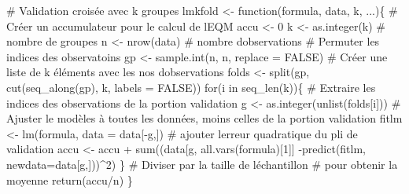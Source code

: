 \documentclass[
  11pt,
  letterpaper,
]{book}
\newenvironment{Shaded}{\begin{snugshade}}{\end{snugshade}}
\newcommand{\AttributeTok}[1]{\textcolor[rgb]{0.40,0.45,0.13}{#1}}
\newcommand{\CommentTok}[1]{\textcolor[rgb]{0.37,0.37,0.37}{#1}}
\newcommand{\ConstantTok}[1]{\textcolor[rgb]{0.56,0.35,0.01}{#1}}
\newcommand{\ControlFlowTok}[1]{\textcolor[rgb]{0.00,0.23,0.31}{#1}}
\newcommand{\DecValTok}[1]{\textcolor[rgb]{0.68,0.00,0.00}{#1}}
\newcommand{\FunctionTok}[1]{\textcolor[rgb]{0.28,0.35,0.67}{#1}}
\newcommand{\NormalTok}[1]{\textcolor[rgb]{0.00,0.23,0.31}{#1}}
\newcommand{\OtherTok}[1]{\textcolor[rgb]{0.00,0.23,0.31}{#1}}
\newcommand{\SpecialCharTok}[1]{\textcolor[rgb]{0.37,0.37,0.37}{#1}}
\theoremstyle{definition}
\theoremstyle{remark}
\begin{document}
\begin{Shaded}
\begin{Highlighting}[]
\CommentTok{\# Validation croisée avec k groupes}
\NormalTok{lmkfold }\OtherTok{\textless{}{-}} \ControlFlowTok{function}\NormalTok{(formula, data, k, ...)\{}
   \CommentTok{\# Créer un accumulateur pour le calcul de l\textquotesingle{}EQM}
\NormalTok{   accu }\OtherTok{\textless{}{-}} \DecValTok{0}
\NormalTok{   k }\OtherTok{\textless{}{-}} \FunctionTok{as.integer}\NormalTok{(k) }\CommentTok{\# nombre de groupes}
\NormalTok{   n }\OtherTok{\textless{}{-}} \FunctionTok{nrow}\NormalTok{(data) }\CommentTok{\# nombre d\textquotesingle{}observations}
   \CommentTok{\# Permuter les indices des observatoins}
\NormalTok{   gp }\OtherTok{\textless{}{-}} \FunctionTok{sample.int}\NormalTok{(n, n, }\AttributeTok{replace =} \ConstantTok{FALSE}\NormalTok{)}
   \CommentTok{\# Créer une liste de k éléments avec les nos d\textquotesingle{}observations}
\NormalTok{   folds }\OtherTok{\textless{}{-}} \FunctionTok{split}\NormalTok{(gp, }\FunctionTok{cut}\NormalTok{(}\FunctionTok{seq\_along}\NormalTok{(gp), k, }\AttributeTok{labels =} \ConstantTok{FALSE}\NormalTok{))}
   \ControlFlowTok{for}\NormalTok{(i }\ControlFlowTok{in} \FunctionTok{seq\_len}\NormalTok{(k))\{}
      \CommentTok{\# Extraire les indices des observations de la portion validation}
\NormalTok{      g }\OtherTok{\textless{}{-}} \FunctionTok{as.integer}\NormalTok{(}\FunctionTok{unlist}\NormalTok{(folds[i]))}
      \CommentTok{\# Ajuster le modèles à toutes les données, moins celles de la portion validation}
\NormalTok{      fitlm }\OtherTok{\textless{}{-}} \FunctionTok{lm}\NormalTok{(formula, }\AttributeTok{data =}\NormalTok{ data[}\SpecialCharTok{{-}}\NormalTok{g,])}
      \CommentTok{\# ajouter l\textquotesingle{}erreur quadratique du pli de validation}
\NormalTok{      accu }\OtherTok{\textless{}{-}}\NormalTok{ accu }\SpecialCharTok{+} \FunctionTok{sum}\NormalTok{((data[g, }\FunctionTok{all.vars}\NormalTok{(formula)[}\DecValTok{1}\NormalTok{]] }\SpecialCharTok{{-}}\FunctionTok{predict}\NormalTok{(fitlm, }\AttributeTok{newdata=}\NormalTok{data[g,]))}\SpecialCharTok{\^{}}\DecValTok{2}\NormalTok{)}
\NormalTok{   \}}
   \CommentTok{\# Diviser par la taille de l\textquotesingle{}échantillon }
   \CommentTok{\# pour obtenir la moyenne}
   \FunctionTok{return}\NormalTok{(accu}\SpecialCharTok{/}\NormalTok{n)}
\NormalTok{\}}


\end{Highlighting}
\end{Shaded}
\end{document}
